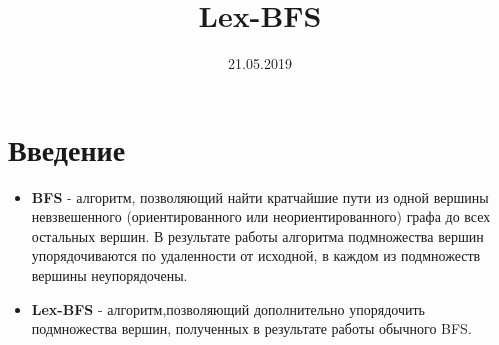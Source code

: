 \documentclass[a4paper,14pt]{article}
\title{Lex-BFS}
\date{21.05.2019}
\author{}
\begin{document}
 

\maketitle
\section{Введение}
\begin{itemize}
	\item \textbf{BFS} - алгоритм, позволяющий найти кратчайшие пути из одной вершины невзвешенного (ориентированного или неориентированного) графа до всех остальных вершин. В результате работы алгоритма подмножества вершин упорядочиваются по удаленности от исходной, в каждом из подмножеств вершины неупорядочены. 
	\item \textbf{Lex-BFS} - алгоритм,позволяющий дополнительно упорядочить подмножества вершин, полученных в результате работы обычного BFS.
\end{itemize}
\end{document}
